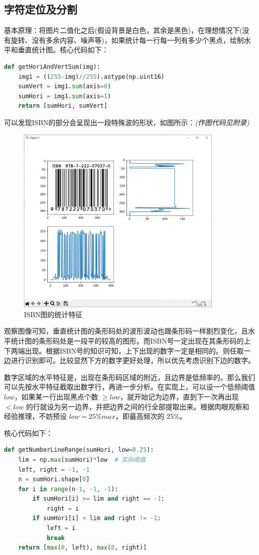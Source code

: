 \documentclass{ctexart}
\begin{document}
\subsection{字符定位及分割}
基本原理：将图片二值化之后(假设背景是白色，其余是黑色)，在理想情况下(没有旋转、没有多余内容、噪声等)，如果统计每一行每一列有多少个黑点，绘制水平和垂直统计图。核心代码如下：
\begin{lstlisting}[language=python]
def getHoriAndVertSum(img):
    img1 = ((255-img)//255).astype(np.uint16)
    sumVert = img1.sum(axis=0)
    sumHori = img1.sum(axis=1)
    return [sumHori, sumVert]
\end{lstlisting}
可以发现ISBN的部分会呈现出一段特殊波的形状，如图所示：\textit{(作图代码见附录)}
\begin{figure}[H]%
    \centering
    \includegraphics[height=260pt]{isbn_sum}
    \caption{ISBN图的统计特征}
\end{figure}

观察图像可知，垂直统计图的条形码处的波形波动也跟条形码一样剧烈变化，且水平统计图的条形码处是一段平的较高的图形。而ISBN号一定出现在其条形码的上下两端出现。根据ISBN号的知识可知，上下出现的数字一定是相同的。则任取一边进行识别即可。比较显然下方的数字更好处理，所以优先考虑识别下边的数字。

数字区域的水平特征是，出现在条形码区域的附近，且边界是低频率的。那么我们可以先按水平特征截取出数字行，再进一步分析。在实现上，可以设一个低频阈值 $low$，如果某一行出现黑点个数 $\ge low$，就开始记为边界，直到下一次再出现 $< low$ 的行就设为另一边界，并把边界之间的行全部提取出来。根据肉眼观察和经验推理，不妨预设 $low=25\%max$，即最高频次的 $25\%$。

核心代码如下：
\begin{lstlisting}[language=python]
def getNumberLineRange(sumHori, low=0.25):
    lim = np.max(sumHori)*low  # 实际阈值
    left, right = -1, -1
    n = sumHori.shape[0]
    for i in range(n-1, -1, -1):
        if sumHori[i] >= lim and right == -1:
            right = i
        if sumHori[i] < lim and right != -1:
            left = i
            break
    return [max(0, left), max(0, right)]
\end{lstlisting}
\end{document}
